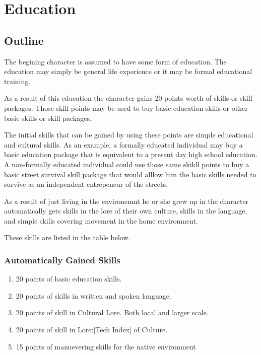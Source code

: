 \chapter{Education}

\section{Outline}

The begining character is assumed to have some form of education. The 
education may simply be general life experience or it may be formal 
educational training. 

As a result of this education the character gains 20 points worth of
skills or skill packages. Those skill points may be used to buy basic  
education skills or other basic skills or skill packages.

The initial skills that can be gained by using these points 
are simple educational and cultural skills. As an example,
a formally educated individual may buy a basic education package
that is equivalent to a present day high school education. A
non-formally educated individual could use those same skikll points 
to buy a basic street survival skill package that would alllow him 
the basic skills needed to survive as an independent entrepeneur of 
the streets.

As a result of just living in the environemnt he or she 
grew up in the character automatically gets skills in the lore of 
their own culture, skills in the language, and simple skills 
covering movement in the home environment.

These skills are listed in the table below.

\subsection{Automatically Gained Skills}
\begin{enumerate}
	\item 20 points of basic education skills.
	\item 20 points of skills in written and spoken language.
	\item 20 points of skill in Cultural Lore. Both local and larger scale.
	\item 20 points of skill in Lore:[Tech Index] of Culture.
	\item 15 points of manuevering skills for the native environment
\end{enumerate}

